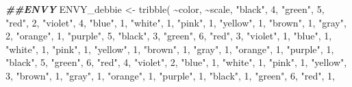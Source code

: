 \documentclass[
]{article}
\newenvironment{Shaded}{\begin{snugshade}}{\end{snugshade}}
\newcommand{\DecValTok}[1]{\textcolor[rgb]{0.00,0.00,0.81}{#1}}
\newcommand{\DocumentationTok}[1]{\textcolor[rgb]{0.56,0.35,0.01}{\textbf{\textit{#1}}}}
\newcommand{\FunctionTok}[1]{\textcolor[rgb]{0.00,0.00,0.00}{#1}}
\newcommand{\NormalTok}[1]{#1}
\newcommand{\OtherTok}[1]{\textcolor[rgb]{0.56,0.35,0.01}{#1}}
\newcommand{\SpecialCharTok}[1]{\textcolor[rgb]{0.00,0.00,0.00}{#1}}
\newcommand{\StringTok}[1]{\textcolor[rgb]{0.31,0.60,0.02}{#1}}
\begin{document}
\begin{Shaded}
\begin{Highlighting}[]
\DocumentationTok{\#\#ENVY}
\NormalTok{ENVY\_debbie }\OtherTok{\textless{}{-}} \FunctionTok{tribble}\NormalTok{(}
  \SpecialCharTok{\textasciitilde{}}\NormalTok{color, }\SpecialCharTok{\textasciitilde{}}\NormalTok{scale,}
  \StringTok{"black"}\NormalTok{, }\DecValTok{4}\NormalTok{,}
  \StringTok{"green"}\NormalTok{, }\DecValTok{5}\NormalTok{,}
  \StringTok{"red"}\NormalTok{, }\DecValTok{2}\NormalTok{,}
  \StringTok{"violet"}\NormalTok{, }\DecValTok{4}\NormalTok{,}
  \StringTok{"blue"}\NormalTok{, }\DecValTok{1}\NormalTok{,}
  \StringTok{"white"}\NormalTok{, }\DecValTok{1}\NormalTok{,}
  \StringTok{"pink"}\NormalTok{, }\DecValTok{1}\NormalTok{,}
  \StringTok{"yellow"}\NormalTok{, }\DecValTok{1}\NormalTok{, }
  \StringTok{"brown"}\NormalTok{, }\DecValTok{1}\NormalTok{,}
  \StringTok{"gray"}\NormalTok{, }\DecValTok{2}\NormalTok{,}
  \StringTok{"orange"}\NormalTok{, }\DecValTok{1}\NormalTok{,}
  \StringTok{"purple"}\NormalTok{, }\DecValTok{5}\NormalTok{,}
    \StringTok{"black"}\NormalTok{, }\DecValTok{3}\NormalTok{,}
  \StringTok{"green"}\NormalTok{, }\DecValTok{6}\NormalTok{,}
  \StringTok{"red"}\NormalTok{, }\DecValTok{3}\NormalTok{,}
  \StringTok{"violet"}\NormalTok{, }\DecValTok{1}\NormalTok{,}
  \StringTok{"blue"}\NormalTok{, }\DecValTok{1}\NormalTok{,}
  \StringTok{"white"}\NormalTok{, }\DecValTok{1}\NormalTok{,}
  \StringTok{"pink"}\NormalTok{, }\DecValTok{1}\NormalTok{,}
  \StringTok{"yellow"}\NormalTok{, }\DecValTok{1}\NormalTok{,}
  \StringTok{"brown"}\NormalTok{, }\DecValTok{1}\NormalTok{,}
  \StringTok{"gray"}\NormalTok{, }\DecValTok{1}\NormalTok{,}
  \StringTok{"orange"}\NormalTok{, }\DecValTok{1}\NormalTok{,}
  \StringTok{"purple"}\NormalTok{, }\DecValTok{1}\NormalTok{,}
    \StringTok{"black"}\NormalTok{, }\DecValTok{5}\NormalTok{,}
  \StringTok{"green"}\NormalTok{, }\DecValTok{6}\NormalTok{,}
  \StringTok{"red"}\NormalTok{, }\DecValTok{4}\NormalTok{,}
  \StringTok{"violet"}\NormalTok{, }\DecValTok{2}\NormalTok{,}
  \StringTok{"blue"}\NormalTok{, }\DecValTok{1}\NormalTok{,}
  \StringTok{"white"}\NormalTok{, }\DecValTok{1}\NormalTok{,}
  \StringTok{"pink"}\NormalTok{, }\DecValTok{1}\NormalTok{,}
  \StringTok{"yellow"}\NormalTok{, }\DecValTok{3}\NormalTok{,}
  \StringTok{"brown"}\NormalTok{, }\DecValTok{1}\NormalTok{,}
  \StringTok{"gray"}\NormalTok{, }\DecValTok{1}\NormalTok{,}
  \StringTok{"orange"}\NormalTok{, }\DecValTok{1}\NormalTok{,}
  \StringTok{"purple"}\NormalTok{, }\DecValTok{1}\NormalTok{,}
    \StringTok{"black"}\NormalTok{, }\DecValTok{1}\NormalTok{,}
  \StringTok{"green"}\NormalTok{, }\DecValTok{6}\NormalTok{,}
  \StringTok{"red"}\NormalTok{, }\DecValTok{1}\NormalTok{,}

\end{Highlighting}
\end{Shaded}
\end{document}
